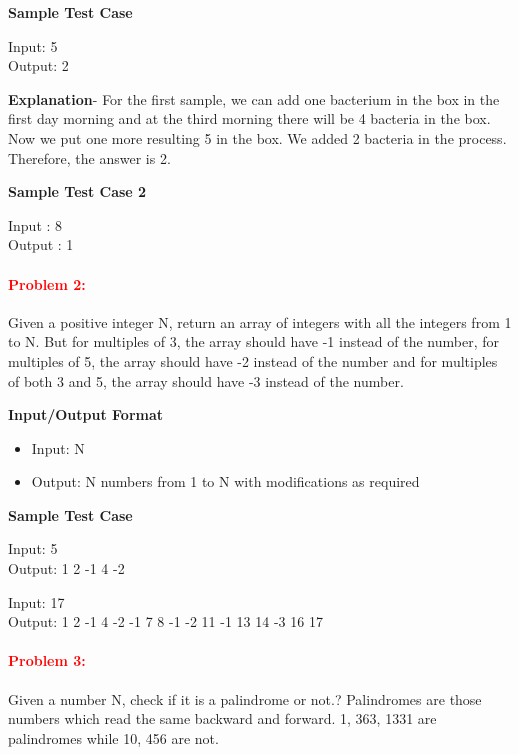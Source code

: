 \documentclass[a4paper,11pt]{article} %
\begin{document}
\textbf{Sample Test Case}

Input: 5\\
Output: 2
\vspace*{0.5cm}

\textbf{Explanation}- For the first sample, we can add one bacterium in the box in the first day morning and at the third morning there will be 4 bacteria in the box. Now we put one more resulting 5 in the box. We added 2 bacteria in the process. Therefore, the answer is 2.
\vspace*{0.5cm}

\textbf{Sample Test Case 2}

Input : 8\\
Output : 1
\vspace*{0.5cm}

\paragraph{\textcolor{red}{Problem 2:}}
Given a positive integer N, return an array of integers with all the integers from 1 to N. But for multiples of 3, the array should have -1 instead of the number, for multiples of 5, the array should have -2 instead of the number and for multiples of both 3 and 5, the array should have -3 instead of the number.

\textbf{Input/Output Format}
\begin{itemize}
    \item  Input: N
    \item  Output: N numbers from 1 to N with modifications as required
\end{itemize}


\textbf{Sample Test Case}

Input: 5\\
Output: 1 2 -1 4 -2
\vspace*{0.5cm}

Input: 17\\
Output: 1 2 -1 4 -2 -1 7 8 -1 -2 11 -1 13 14 -3 16 17
\vspace*{0.3cm}

\newpage
\paragraph{\textcolor{red}{Problem 3:}}
Given a number N, check if it is a palindrome or not.? Palindromes are those numbers which read the same backward and forward. 1, 363, 1331 are palindromes while 10, 456 are not.
\end{document}
